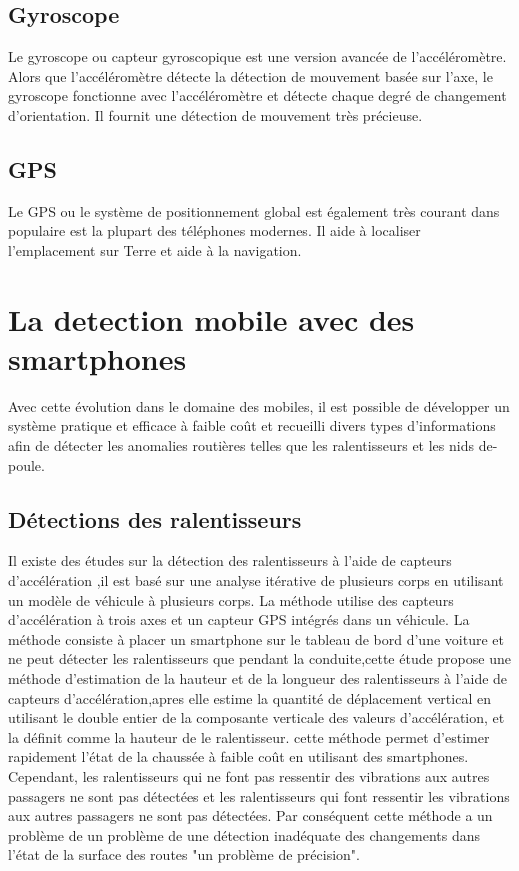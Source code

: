  \subsection{Gyroscope}
Le gyroscope ou capteur gyroscopique est une version avancée de l'accéléromètre. Alors que l'accéléromètre détecte la détection de mouvement basée sur l'axe, le gyroscope fonctionne avec l'accéléromètre et détecte chaque degré de changement d'orientation. Il fournit une détection de mouvement très précieuse.

\subsection{GPS}
Le GPS ou le système de positionnement global est également très courant dans populaire est la plupart des téléphones modernes. Il aide à localiser l'emplacement sur Terre et aide à la navigation.


\section{La detection mobile avec des smartphones}

Avec cette évolution dans le domaine des mobiles, il est possible de développer un système pratique et efficace à faible coût et recueilli divers types d'informations afin de détecter les anomalies routières telles que les ralentisseurs et les nids de-poule.

\subsection{Détections des ralentisseurs}
Il existe des études sur la détection des ralentisseurs à l'aide de capteurs d'accélération \cite{nomuraMethodEstimatingRoad2015},il est basé sur une analyse itérative de plusieurs corps en utilisant un modèle de véhicule à plusieurs corps. La méthode \cite{nomuraMethodEstimatingRoad2015} utilise des capteurs d'accélération à trois axes et un capteur GPS intégrés dans un véhicule.\newline
La méthode \cite {nomuraMethodEstimatingRoad2015} consiste à placer un smartphone sur le tableau de bord d'une voiture et ne peut détecter les ralentisseurs que pendant la conduite,cette étude propose une méthode d'estimation de la hauteur et de la longueur des ralentisseurs à l'aide de capteurs d'accélération,apres elle estime la quantité de déplacement vertical en utilisant le double entier de la composante verticale des valeurs d'accélération, et la définit comme la hauteur de le ralentisseur. cette méthode permet d'estimer rapidement l'état de la chaussée à faible coût en utilisant des smartphones. Cependant, les ralentisseurs qui ne font pas ressentir des vibrations aux autres passagers ne sont pas détectées et les ralentisseurs qui font ressentir les vibrations aux autres passagers ne sont pas détectées.\newline
Par conséquent cette méthode a un problème de un problème de une détection inadéquate des changements dans l'état de la surface des routes "un problème de précision".

